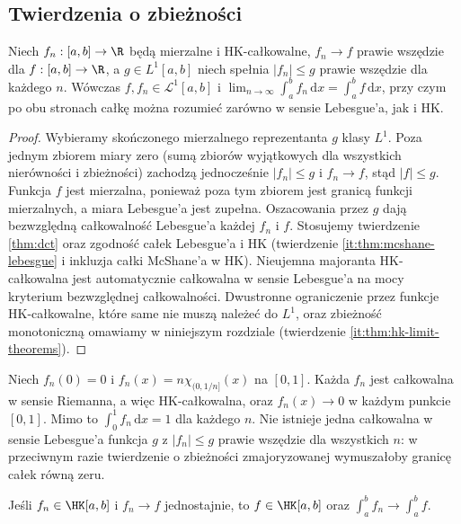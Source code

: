 \subsection{Twierdzenia o zbieżności}
\begin{twierdzenie}\label{ma1:kh:tw:hk-zbieznosc-dct}\label{tw:hk-zbieznosc-dct}
Niech $f_n:[a,b]\to\R$ będą mierzalne i HK-całkowalne, $f_n\to f$ prawie wszędzie dla $f:[a,b]\to\R$, a $g\in L^1[a,b]$ niech spełnia $|f_n|\le g$ prawie wszędzie dla każdego $n$. Wówczas $f,f_n\in\mathcal L^1[a,b]$ i
$\lim_{n\to\infty}\int_a^bf_n\,\mathrm dx=\int_a^bf\,\mathrm dx$, przy czym po obu stronach całkę można rozumieć zarówno w sensie Lebesgue'a, jak i HK.
\end{twierdzenie}
\begin{proof}
Wybieramy skończonego mierzalnego reprezentanta $g$ klasy $L^1$. Poza jednym zbiorem miary zero (sumą zbiorów wyjątkowych dla wszystkich nierówności i zbieżności) zachodzą jednocześnie $|f_n|\le g$ i $f_n\to f$, stąd $|f|\le g$. Funkcja $f$ jest mierzalna, ponieważ poza tym zbiorem jest granicą funkcji mierzalnych, a miara Lebesgue'a jest zupełna. Oszacowania przez $g$ dają bezwzględną całkowalność Lebesgue'a każdej $f_n$ i $f$. Stosujemy twierdzenie \ref{thm:dct} oraz zgodność całek Lebesgue'a i HK (twierdzenie \ref{it:thm:mcshane-lebesgue} i inkluzja całki McShane'a w HK). Nieujemna majoranta HK-całkowalna jest automatycznie całkowalna w sensie Lebesgue'a na mocy kryterium bezwzględnej całkowalności. Dwustronne ograniczenie przez funkcje HK-całkowalne, które same nie muszą należeć do $L^1$, oraz zbieżność monotoniczną omawiamy w niniejszym rozdziale (twierdzenie \ref{it:thm:hk-limit-theorems}).
\end{proof}
\begin{przyklad}
Niech $f_n(0)=0$ i $f_n(x)=n\chi_{(0,1/n]}(x)$ na $[0,1]$. Każda $f_n$ jest całkowalna w sensie Riemanna, a więc HK-całkowalna, oraz $f_n(x)\to0$ w każdym punkcie $[0,1]$. Mimo to $\int_0^1f_n\,\mathrm dx=1$ dla każdego $n$. Nie istnieje jedna całkowalna w sensie Lebesgue'a funkcja $g$ z $|f_n|\le g$ prawie wszędzie dla wszystkich $n$: w przeciwnym razie twierdzenie o zbieżności zmajoryzowanej wymuszałoby granicę całek równą zeru.
\end{przyklad}
\begin{stwierdzenie}\label{ma1:kh:st:hk-zbieznosc-jednostajna}\label{st:hk-zbieznosc-jednostajna}
Jeśli $f_n\in\HK[a,b]$ i $f_n\to f$ jednostajnie, to $f\in\HK[a,b]$ oraz $\int_a^bf_n\to\int_a^bf$.
\end{stwierdzenie}
